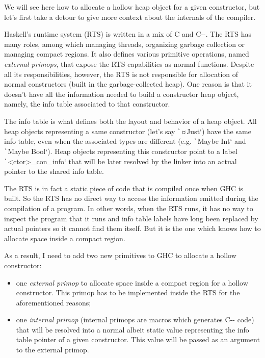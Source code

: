 \documentclass[english]{jflart}
\begin{document}
We will see here how to allocate a hollow heap object for a given constructor, but let's first take a detour to give more context about the internals of the compiler.

Haskell's runtime system (RTS) is written in a mix of C and C-{}-. The RTS has many roles, among which managing threads, organizing garbage collection or managing compact regions. It also defines various primitive operations, named \emph{external primops}, that expose the RTS capabilities as normal functions. Despite all its responsibilities, however, the RTS is not responsible for allocation of normal constructors (built in the garbage-collected heap). One reason is that it doesn't have all the information needed to build a constructor heap object, namely, the info table associated to that constructor.

The info table is what defines both the layout and behavior of a heap object. All heap objects representing a same constructor (let's say \texttt`¤Just`) have the same info table, even when the associated types are different (e.g. \texttt`Maybe Int` and \texttt`Maybe Bool`). Heap objects representing this constructor point to a label \texttt`<ctor>_con_info` that will be later resolved by the linker into an actual pointer to the shared info table.

The RTS is in fact a static piece of code that is compiled once when GHC is built. So the RTS has no direct way to access the information emitted during the compilation of a program. In other words, when the RTS runs, it has no way to inspect the program that it runs and info table labels have long been replaced by actual pointers so it cannot find them itself. But it is the one which knows how to allocate space inside a compact region.

As a result, I need to add two new primitives to GHC to allocate a hollow constructor:

\begin{itemize}
\item one \emph{external primop} to allocate space inside a compact region for a hollow constructor. This primop has to be implemented inside the RTS for the aforementioned reasons;
\item one \emph{internal primop} (internal primops are macros which generates C-{}- code) that will be resolved into a normal albeit static value representing the info table pointer of a given constructor. This value will be passed as an argument to the external primop.
\end{itemize}
\end{document}
